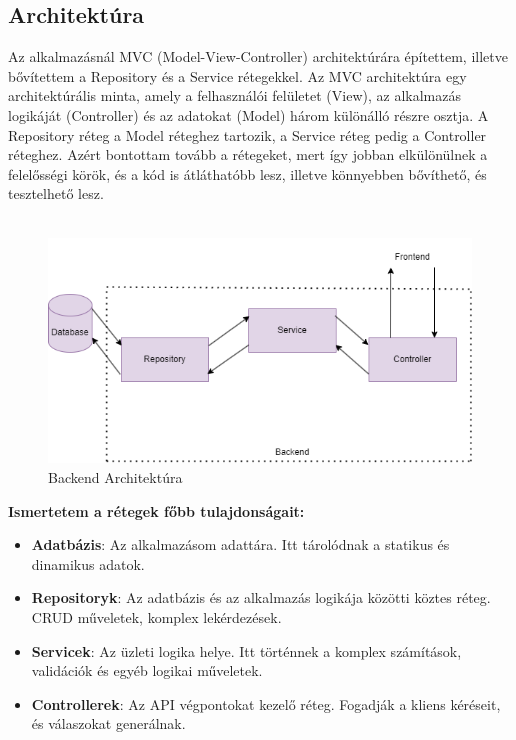 \subsection*{Architektúra}
Az alkalmazásnál MVC (Model-View-Controller) architektúrára építettem, illetve
bővítettem a Repository és a Service rétegekkel. Az MVC architektúra egy
architektúrális minta, amely a felhasználói felületet (View), az alkalmazás
logikáját (Controller) és az adatokat (Model) három különálló részre osztja.
A Repository réteg a Model réteghez tartozik, a Service réteg pedig a Controller réteghez.
Azért bontottam tovább a rétegeket, mert így jobban elkülönülnek a felelősségi körök,
és a kód is átláthatóbb lesz, illetve könnyebben bővíthető, és tesztelhető lesz.
\\
\\
\begin{figure}[H]
    \centering
    \includegraphics[width=14.0truecm]{images/Backend_architecture.png}
    \caption{Backend Architektúra}
    \label{fig:backend_architecture}
\end{figure}
\textbf{Ismertetem a rétegek főbb tulajdonságait:}
\begin{itemize}
    \item \textbf{Adatbázis}: Az alkalmazásom adattára. Itt tárolódnak a statikus és dinamikus adatok.
    \item \textbf{Repositoryk}: Az adatbázis és az alkalmazás logikája közötti köztes réteg. CRUD műveletek, komplex lekérdezések.
    \item \textbf{Servicek}: Az üzleti logika helye. Itt történnek a komplex számítások, validációk és egyéb logikai műveletek.
    \item \textbf{Controllerek}: Az API végpontokat kezelő réteg. Fogadják a kliens kéréseit, és válaszokat generálnak.
\end{itemize}

